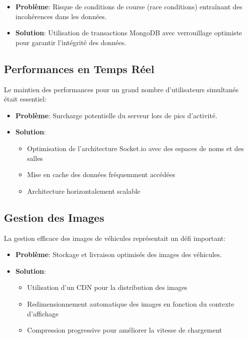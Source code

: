 \begin{itemize}
    \item \textbf{Problème}: Risque de conditions de course (race conditions) entraînant des incohérences dans les données.
    \item \textbf{Solution}: Utilisation de transactions MongoDB avec verrouillage optimiste pour garantir l'intégrité des données.
\end{itemize}

\subsection{Performances en Temps Réel}
Le maintien des performances pour un grand nombre d'utilisateurs simultanés était essentiel:

\begin{itemize}
    \item \textbf{Problème}: Surcharge potentielle du serveur lors de pics d'activité.
    \item \textbf{Solution}: 
    \begin{itemize}
        \item Optimisation de l'architecture Socket.io avec des espaces de noms et des salles
        \item Mise en cache des données fréquemment accédées
        \item Architecture horizontalement scalable
    \end{itemize}
\end{itemize}

\subsection{Gestion des Images}
La gestion efficace des images de véhicules représentait un défi important:

\begin{itemize}
    \item \textbf{Problème}: Stockage et livraison optimisés des images des véhicules.
    \item \textbf{Solution}: 
    \begin{itemize}
        \item Utilisation d'un CDN pour la distribution des images
        \item Redimensionnement automatique des images en fonction du contexte d'affichage
        \item Compression progressive pour améliorer la vitesse de chargement
    \end{itemize}
\end{itemize} 